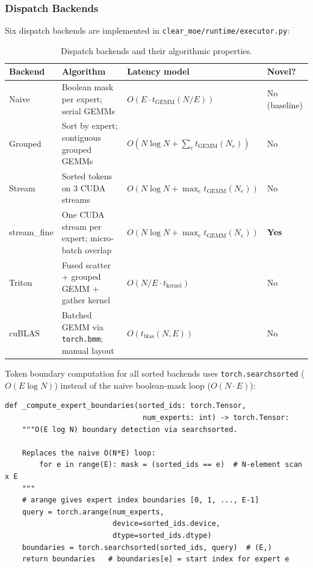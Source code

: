 \documentclass[12pt,a4paper]{article}
\begin{document}
\subsubsection{Dispatch Backends}

Six dispatch backends are implemented in \texttt{clear\_moe/runtime/executor.py}:

\begin{table}[H]
\centering
\caption{Dispatch backends and their algorithmic properties.}
\label{tab:dispatch_algo}
\begin{tabular}{llll}
\toprule
\textbf{Backend} & \textbf{Algorithm} & \textbf{Latency model} & \textbf{Novel?} \\
\midrule
Naive          & Boolean mask per expert; serial GEMMs & $O(E \cdot t_\text{GEMM}(N/E))$ & No (baseline) \\
Grouped        & Sort by expert; contiguous grouped GEMMs & $O(N\log N + \sum_e t_\text{GEMM}(N_e))$ & No \\
Stream         & Sorted tokens on 3 CUDA streams & $O(N\log N + \max_e t_\text{GEMM}(N_e))$ & No \\
stream\_fine   & One CUDA stream per expert; micro-batch overlap & $O(N\log N + \max_e t_\text{GEMM}(N_e))$ & \textbf{Yes} \\
Triton         & Fused scatter + grouped GEMM + gather kernel & $O(N/E \cdot t_\text{kernel})$ & No \\
cuBLAS         & Batched GEMM via \texttt{torch.bmm}; manual layout & $O(t_\text{blas}(N, E))$ & No \\
\bottomrule
\end{tabular}
\end{table}

Token boundary computation for all sorted backends uses \texttt{torch.searchsorted} ($O(E \log N)$) instead of the naive boolean-mask loop ($O(N \cdot E)$):

\begin{lstlisting}[caption={Efficient boundary computation for grouped dispatch.},label={lst:searchsorted}]
def _compute_expert_boundaries(sorted_ids: torch.Tensor,
                                num_experts: int) -> torch.Tensor:
    """O(E log N) boundary detection via searchsorted.

    Replaces the naive O(N*E) loop:
        for e in range(E): mask = (sorted_ids == e)  # N-element scan x E
    """
    # arange gives expert index boundaries [0, 1, ..., E-1]
    query = torch.arange(num_experts,
                         device=sorted_ids.device,
                         dtype=sorted_ids.dtype)
    boundaries = torch.searchsorted(sorted_ids, query)  # (E,)
    return boundaries   # boundaries[e] = start index for expert e
\end{lstlisting}
\end{document}
